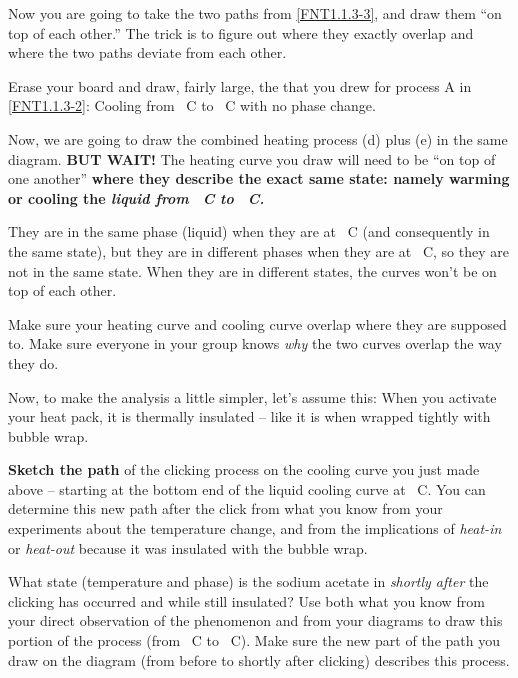 \begin{benumerate}

	
	Now you are going to take the two paths from \ref{FNT1.1.3-3}, and draw them ``on top of each other.'' The trick is to figure out where they exactly overlap and where the two paths deviate from each other.
	
	Erase your board and draw, fairly large, the \TempGraph{} that you drew for process A in \ref{FNT1.1.3-2}: Cooling from \unit[100]{\textdegree C} to \unit[23]{\textdegree C} with no phase change.
	
	Now, we are going to draw the combined heating process (d) plus (e) in the same diagram. \textbf{BUT WAIT!} The heating curve you draw will need to be ``on top of one another'' \textbf{where they describe the exact same state: namely warming or cooling the {\em liquid from \unit[54]{\textdegree C} to \unit[100]{\textdegree C}.}}
	
	They are in the same phase (liquid) when they are at \unit[100]{\textdegree C} (and consequently in the same state), but they are in different phases when they are at \unit[23]{\textdegree C}, so they are not in the same state. When they are in different states, the curves won't be on top of each other.
	
	Make sure your heating curve and cooling curve overlap where they are supposed to. Make sure everyone in your group knows {\em why} the two curves overlap the way they do.

\WCD

	
	Now, to make the analysis a little simpler, let's assume this: When you activate your heat pack, it is thermally insulated -- like it is when wrapped tightly with bubble wrap.
	
	\textbf{Sketch the path} of the clicking process on the cooling curve you just made above -- starting at the bottom end of the liquid cooling curve at \unit[23]{\textdegree C}. You can determine this new path after the click from what you know from your experiments about the temperature change, and from the implications of {\em heat-in} or {\em heat-out} because it was insulated with the bubble wrap.
	
	What state (temperature and phase) is the sodium acetate in {\em shortly after} the clicking has occurred and while still insulated? Use both what you know from your direct observation of the phenomenon and from your diagrams to draw this portion of the process (from \unit[23]{\textdegree C} to \unit[54]{\textdegree C}). Make sure the new part of the path you draw on the diagram (from before to shortly after clicking) describes this process.
	

\end{benumerate}
